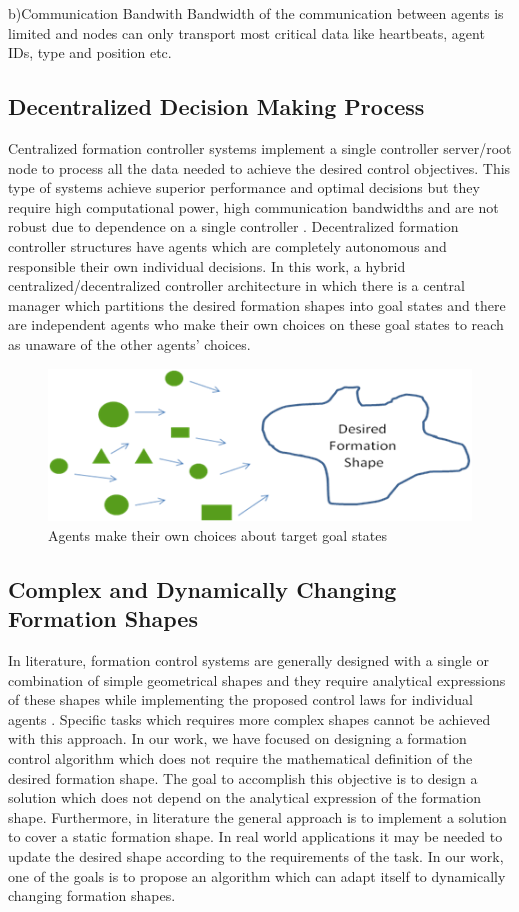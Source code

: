 b)Communication Bandwith \newline
Bandwidth of the communication between agents is limited and nodes can only transport most critical data like heartbeats, agent IDs, type and position etc.

\subsection{ Decentralized Decision Making Process}
Centralized formation controller systems implement a single controller  server/root node
to process all the data needed to achieve the desired control objectives. This type of systems achieve superior performance and optimal decisions  but they require high computational power, high communication bandwidths and are not robust due to dependence on a single controller \cite{12}. Decentralized formation controller structures have agents which are completely autonomous and responsible their own individual decisions. In this work, a hybrid centralized/decentralized controller architecture in which there is a central manager which partitions the desired formation shapes into goal states and there are independent agents who make their own choices on these goal states to reach as unaware of the other agents' choices.

\begin{figure}[H]
\caption{Agents make their own choices about target goal states}
\centering
\includegraphics[scale = 0.9]{decentralized}
\end{figure} 

\subsection{Complex and Dynamically Changing Formation Shapes}
In literature, formation control systems are generally designed with a single or combination of simple geometrical shapes and they require analytical expressions of these shapes while implementing the proposed control laws for individual agents \cite{93}. Specific tasks which requires more complex shapes cannot be achieved with this approach. In our work, we have focused on designing a formation control algorithm which does not require the mathematical definition of the desired formation shape. The goal to accomplish this objective is to design a solution which does not depend on the analytical expression of the formation shape. Furthermore, in literature the general approach is to implement a solution to cover a static formation shape. In real world applications it may be needed to update the desired shape according to the requirements of the task. In our work, one of the goals is to propose an algorithm which can adapt itself to dynamically changing formation shapes.

